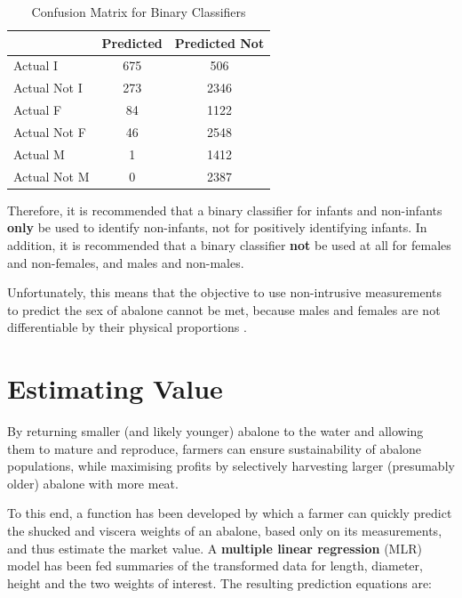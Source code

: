 \documentclass[11pt, a4paper]{article}
\begin{document}
    \begin{table}
        \centering
        \begin{tabular}{|l|c|c|}
            \hline
                            & Predicted & Predicted Not \\
            \hline
            Actual I        & 675       & 506 \\
            Actual Not I    & 273       & 2346 \\
            \hline
            Actual F        & 84        & 1122 \\
            Actual Not F    & 46        & 2548 \\
            \hline
            Actual M        & 1         & 1412 \\
            Actual Not M    & 0         & 2387 \\
            \hline           
        \end{tabular}
        \caption{Confusion Matrix for Binary Classifiers}
        \label{cms}
    \end{table}

    Therefore, it is recommended that a binary classifier for infants and non-infants \textbf{only} be used to identify non-infants, not for positively identifying infants. In addition, it is recommended that a binary classifier \textbf{not} be used at all for females and non-females, and males and non-males.

    Unfortunately, this means that the objective to use non-intrusive measurements to predict the sex of abalone cannot be met, because males and females are not differentiable by their physical proportions \parencite{nsw}.

    \section{Estimating Value}

    By returning smaller (and likely younger) abalone to the water and allowing them to mature and reproduce, farmers can ensure sustainability of abalone populations, while maximising profits by selectively harvesting larger (presumably older) abalone with more meat.

    To this end, a function has been developed by which a farmer can quickly predict the shucked and viscera weights of an abalone, based only on its measurements, and thus estimate the market value. A \textbf{multiple linear regression} (MLR) model has been fed summaries of the transformed data for length, diameter, height and the two weights of interest. The resulting prediction equations are:
\end{document}
